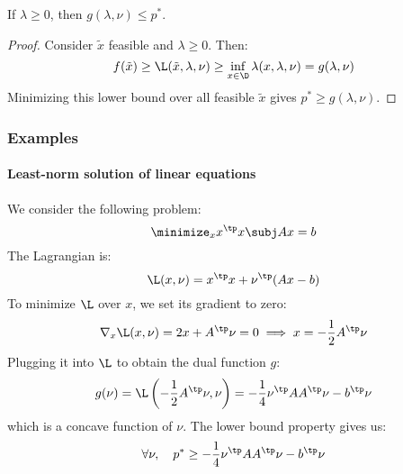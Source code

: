 \begin{property}
    If $\lambda\geq0$, then $g(\lambda, \nu)\leq p^*$.
\end{property}
\begin{proof}
    Consider $\tilde{x}$ feasible and $\lambda\geq0$. Then:
    \begin{equation*}
        f(\tilde{x})\geq\L(\tilde{x},\lambda,\nu) \geq \inf_{x\in\D} \lambda(x,\lambda, \nu) = g(\lambda, \nu)
    \end{equation*}
    Minimizing this lower bound over all feasible $\tilde{x}$ gives $p^*\geq g(\lambda, \nu)$.
\end{proof}

\subsubsection{Examples}
\paragraph*{Least-norm solution of linear equations}
We consider the following problem:
\begin{equation*}
    \minimize_x x^\tp x \subj Ax=b
\end{equation*}
The Lagrangian is:
\begin{equation*}
    \L(x, \nu) = x^\tp x + \nu^\tp(Ax-b)
\end{equation*}
To minimize $\L$ over $x$, we set its gradient to zero:
\begin{equation*}
    \nabla_x\L(x, \nu) = 2x + A^\tp\nu = 0 \implies x = -\frac{1}{2}A^\tp\nu
\end{equation*}
Plugging it into $\L$ to obtain the dual function $g$:
\begin{equation*}
    g(\nu) = \L\left(-\frac{1}{2}A^\tp\nu, \nu\right) = -\frac{1}{4}\nu^\tp AA^\tp\nu - b^\tp\nu
\end{equation*}
which is a concave function of $\nu$. The lower bound property gives us:
\begin{equation*}
    \forall\nu, \quad p^* \geq -\frac{1}{4}\nu^\tp AA^\tp\nu - b^\tp\nu
\end{equation*}

